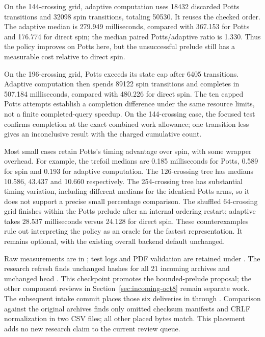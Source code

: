 

On the 144-crossing grid, adaptive computation uses 18432 discarded Potts
transitions and 32098 spin transitions, totaling 50530. It reuses the checked
order. The adaptive median is 279.949 milliseconds, compared with 367.153
for Potts and 176.774 for direct spin; the median paired Potts/adaptive ratio
is 1.330. Thus the policy improves on Potts here, but the unsuccessful prelude
still has a measurable cost relative to direct spin.

On the 196-crossing grid, Potts exceeds its state cap after 6405 transitions.
Adaptive computation then spends 89122 spin transitions and completes in
507.184 milliseconds, compared with 480.226 for direct spin. The ten capped
Potts attempts establish a completion difference under the same resource
limits, not a finite completed-query speedup. On the 144-crossing case,
the focused test confirms completion at the exact combined work allowance;
one transition less gives an inconclusive result with the charged cumulative count.

Most small cases retain Potts's timing advantage over spin, with some wrapper
overhead. For example, the trefoil medians are 0.185 milliseconds for Potts,
0.589 for spin and 0.193 for adaptive computation. The 126-crossing tree has
medians 10.586, 43.437 and 10.660 respectively. The 254-crossing tree has
substantial timing variation, including different medians for the identical
Potts arms, so it does not support a precise small percentage comparison.
The shuffled 64-crossing grid finishes within the Potts prelude after an
internal ordering restart; adaptive takes 28.537 milliseconds versus 24.128
for direct spin. These counterexamples rule out interpreting the policy as
an oracle for the fastest representation. It remains optional, with the
existing overall backend default unchanged.

Raw measurements are in ; test
logs and PDF validation are retained under . The
research refresh finds unchanged hashes for all 21 incoming archives and
unchanged  head . This checkpoint promotes
the bounded-prelude proposal; the other component reviews in
Section~\ref{sec:incoming-oct8} remain separate work.
The subsequent intake commit  places those six deliveries in
 through . Comparison against the original
archives finds only omitted checksum manifests and CRLF normalization in two
CSV files; all other placed bytes match. This placement adds no new research
claim to the current review queue.
